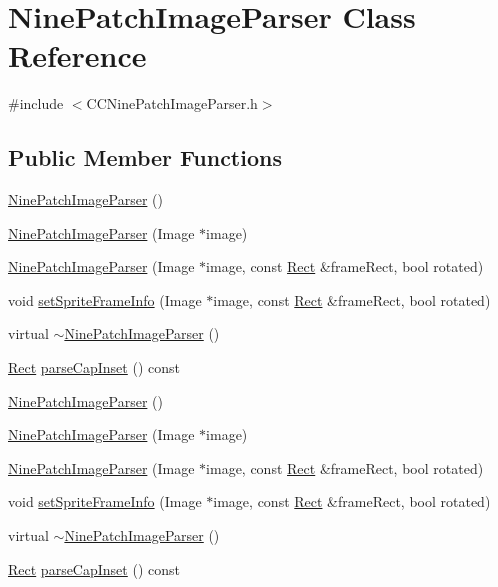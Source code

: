 \hypertarget{classNinePatchImageParser}{}\section{Nine\+Patch\+Image\+Parser Class Reference}
\label{classNinePatchImageParser}


{\ttfamily \#include $<$C\+C\+Nine\+Patch\+Image\+Parser.\+h$>$}

\subsection*{Public Member Functions}
\begin{DoxyCompactItemize}
\item 
\hyperlink{classNinePatchImageParser_ad64d0b93c7f5a73386ba972d0f3a4d8d}{Nine\+Patch\+Image\+Parser} ()
\item 
\hyperlink{classNinePatchImageParser_a64d01b936897a64a9cd6c5325c01f074}{Nine\+Patch\+Image\+Parser} (Image $\ast$image)
\item 
\hyperlink{classNinePatchImageParser_af6a7854a94eb39c9881b90b5c1c04e0f}{Nine\+Patch\+Image\+Parser} (Image $\ast$image, const \hyperlink{classRect}{Rect} \&frame\+Rect, bool rotated)
\item 
void \hyperlink{classNinePatchImageParser_a304418601a8d21cc6cd894158b605ea3}{set\+Sprite\+Frame\+Info} (Image $\ast$image, const \hyperlink{classRect}{Rect} \&frame\+Rect, bool rotated)
\item 
virtual \hyperlink{classNinePatchImageParser_afbc12ecc1d19ebe03223c78ec2808e48}{$\sim$\+Nine\+Patch\+Image\+Parser} ()
\item 
\hyperlink{classRect}{Rect} \hyperlink{classNinePatchImageParser_a85313610f427ab890684f3c5fc4fe3c7}{parse\+Cap\+Inset} () const
\item 
\hyperlink{classNinePatchImageParser_ad64d0b93c7f5a73386ba972d0f3a4d8d}{Nine\+Patch\+Image\+Parser} ()
\item 
\hyperlink{classNinePatchImageParser_a64d01b936897a64a9cd6c5325c01f074}{Nine\+Patch\+Image\+Parser} (Image $\ast$image)
\item 
\hyperlink{classNinePatchImageParser_af6a7854a94eb39c9881b90b5c1c04e0f}{Nine\+Patch\+Image\+Parser} (Image $\ast$image, const \hyperlink{classRect}{Rect} \&frame\+Rect, bool rotated)
\item 
void \hyperlink{classNinePatchImageParser_a304418601a8d21cc6cd894158b605ea3}{set\+Sprite\+Frame\+Info} (Image $\ast$image, const \hyperlink{classRect}{Rect} \&frame\+Rect, bool rotated)
\item 
virtual \hyperlink{classNinePatchImageParser_aa111308955969701a1c0f28025b646cd}{$\sim$\+Nine\+Patch\+Image\+Parser} ()
\item 
\hyperlink{classRect}{Rect} \hyperlink{classNinePatchImageParser_a85313610f427ab890684f3c5fc4fe3c7}{parse\+Cap\+Inset} () const
\end{DoxyCompactItemize}
